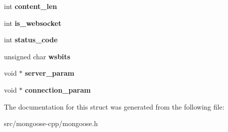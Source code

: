 \begin{DoxyCompactItemize}
\item 
int {\bfseries content\+\_\+len}\hypertarget{structmg__connection_a2581df0eeaff03bd30a262d20f89f2df}{}\label{structmg__connection_a2581df0eeaff03bd30a262d20f89f2df}

\item 
int {\bfseries is\+\_\+websocket}\hypertarget{structmg__connection_ad1642e1e64e670e8af715a5aad9e06b0}{}\label{structmg__connection_ad1642e1e64e670e8af715a5aad9e06b0}

\item 
int {\bfseries status\+\_\+code}\hypertarget{structmg__connection_ae0163f2496aed16dc972e2139b66bb93}{}\label{structmg__connection_ae0163f2496aed16dc972e2139b66bb93}

\item 
unsigned char {\bfseries wsbits}\hypertarget{structmg__connection_af8a3cf1b8a177aaf88f7fce4adc0ba68}{}\label{structmg__connection_af8a3cf1b8a177aaf88f7fce4adc0ba68}

\item 
void $\ast$ {\bfseries server\+\_\+param}\hypertarget{structmg__connection_a1d8ed96e79904e61cbcaa85812c040a8}{}\label{structmg__connection_a1d8ed96e79904e61cbcaa85812c040a8}

\item 
void $\ast$ {\bfseries connection\+\_\+param}\hypertarget{structmg__connection_abd930cc6bad9df41986f7c63bddd1d47}{}\label{structmg__connection_abd930cc6bad9df41986f7c63bddd1d47}

\end{DoxyCompactItemize}


The documentation for this struct was generated from the following file\+:\begin{DoxyCompactItemize}
\item 
src/mongoose-\/cpp/mongoose.\+h\end{DoxyCompactItemize}
